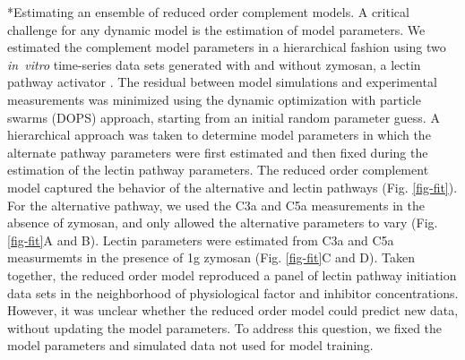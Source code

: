 \documentclass[12pt]{article}
\makeatletter
\renewcommand\subsection{\@startsection
	{subsection}{2}{0mm}
	{-0.05in}
	{-0.5\baselineskip}
	{\normalfont\normalsize\bfseries}}
\makeatother
\begin{document}
\subsection*{Estimating an ensemble of reduced order complement models.}
A critical challenge for any dynamic model is the estimation of model parameters.
We estimated the complement model parameters in a hierarchical fashion using two \textit{in~vitro} time-series data sets generated with and without zymosan, a lectin pathway activator \cite{morad2015time}.
The residual between model simulations and experimental measurements was minimized using the dynamic optimization with particle swarms (DOPS) approach,
starting from an initial random parameter guess.
A hierarchical approach was taken to determine model parameters in which the alternate pathway parameters were first estimated and then fixed during the estimation of the lectin pathway parameters.
The reduced order complement model captured the behavior of the alternative and lectin pathways (Fig. \ref{fig-fit}).
For the alternative pathway, we used the C3a and C5a measurements in the absence of zymosan, and only allowed the alternative parameters to vary (Fig. \ref{fig-fit}A and B).
Lectin parameters were estimated from C3a and C5a measurmemts in the presence of 1g zymosan (Fig. \ref{fig-fit}C and D).
Taken together, the reduced order model reproduced a panel of lectin pathway initiation data sets in the neighborhood of physiological factor and inhibitor concentrations.
However, it was unclear whether the reduced order model could predict new data, without updating the model parameters.
To address this question, we fixed the model parameters and simulated data not used for model training.

\end{document}
